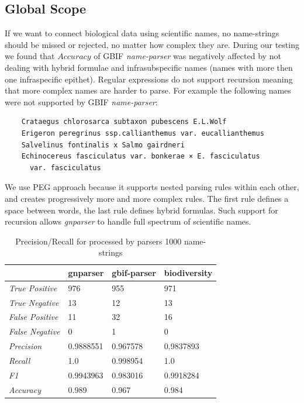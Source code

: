 \documentclass{bmcart}
\begin{document}
\subsection*{Global Scope}

If we want to connect biological data using scientific names, no
name-strings should be missed or rejected, no matter how complex they are. During our
testing we found that $Accuracy$ of GBIF \textit{name-parser} was negatively
affected by not dealing with hybrid formulae and infrasubspecific names (names
with more then one infraspecific epithet). Regular expressions do not support
recursion meaning that more complex names are harder to parse.
For example the following names were not supported by GBIF
\textit{name-parser}:

\vspace{0.5cm}

\begin{verbatim}
    Crataegus chlorosarca subtaxon pubescens E.L.Wolf
    Erigeron peregrinus ssp.callianthemus var. eucallianthemus
    Salvelinus fontinalis x Salmo gairdneri
    Echinocereus fasciculatus var. bonkerae × E. fasciculatus
      var. fasciculatus
\end{verbatim}

\vspace{0.5cm}

We use PEG approach because it supports nested parsing rules within each
other, and creates progressively more and more complex rules. The first rule defines a space between words, the last rule defines hybrid
formulas.  Such support for recursion allows \textit{gnparser} to handle full
spectrum of scientific names.

\begin{table}[htb]
  \begin{center}
    \caption{Precision/Recall for processed by parsers 1000
    name-strings}\label{table:precision}
    \resizebox{10cm}{!} {
    \begin{tabular}{|l|*{3}{l}|}
      \hline
                             & gnparser & gbif-parser & biodiversity \\
      \hline
      \textit{True Positive} & 976      & 955         & 971          \\
      \textit{True Negative} & 13       & 12          & 13           \\
      \textit{False Positive}& 11       & 32          & 16           \\
      \textit{False Negative}& 0        & 1           & 0            \\
      \textit{Precision}     & 0.9888551& 0.967578    & 0.9837893    \\
      \textit{Recall}        & 1.0      & 0.998954    & 1.0          \\
      \textit{F1}            & 0.9943963& 0.983016    & 0.9918284    \\
      \textit{Accuracy}      & 0.989    & 0.967       & 0.984        \\
      \hline
    \end{tabular}
    }
  \end{center}
\end{table}
\end{document}
